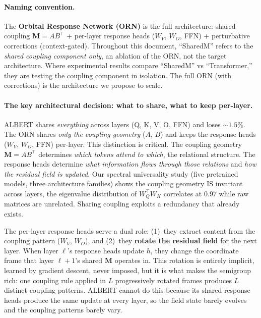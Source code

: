 \documentclass[11pt, a4paper]{article}
\newcommand{\M}{\mathbf{M}}
\theoremstyle{remark}
\begin{document}
\paragraph{Naming convention.}
The \textbf{Orbital Response Network (ORN)} is the full architecture: shared coupling $\M = AB^\top$ + per-layer response heads ($W_V$, $W_O$, FFN) + perturbative corrections (context-gated).
Throughout this document, ``SharedM'' refers to the \emph{shared coupling component only}, an ablation of the ORN, not the target architecture.
Where experimental results compare ``SharedM'' vs ``Transformer,'' they are testing the coupling component in isolation.
The full ORN (with corrections) is the architecture we propose to scale.

\paragraph{The key architectural decision: what to share, what to keep per-layer.}
ALBERT shares \emph{everything} across layers (Q, K, V, O, FFN) and loses ${\sim}1.5\%$.
The ORN shares \emph{only the coupling geometry} ($A$, $B$) and keeps the response heads ($W_V$, $W_O$, FFN) per-layer.
This distinction is critical.
The coupling geometry $\M = AB^\top$ determines \emph{which tokens attend to which}, the relational structure.
The response heads determine \emph{what information flows through those relations} and \emph{how the residual field is updated}.
Our spectral universality study (five pretrained models, three architecture families) shows the coupling geometry IS invariant across layers, the eigenvalue distribution of $W_Q^\top W_K$ correlates at $0.97$ while raw matrices are unrelated.
Sharing coupling exploits a redundancy that already exists.

The per-layer response heads serve a dual role: (1)~they extract content from the coupling pattern ($W_V$, $W_O$), and (2)~they \textbf{rotate the residual field} for the next layer.
When layer $\ell$'s response heads update $h$, they change the coordinate frame that layer $\ell{+}1$'s shared $\M$ operates in.
This rotation is entirely implicit, learned by gradient descent, never imposed, but it is what makes the semigroup rich: one coupling rule applied in $L$ progressively rotated frames produces $L$ distinct coupling patterns.
ALBERT cannot do this because its shared response heads produce the same update at every layer, so the field state barely evolves and the coupling patterns barely vary.

\tableofcontents
\newpage
\end{document}
